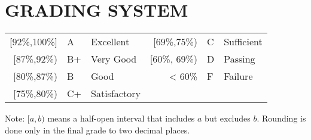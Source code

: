 \documentclass[10pt]{article}
\begin{document}
\section{GRADING SYSTEM}
\begin{center}
	\begin{tabular}{rll|rll}
	{[}92\%,100\%] & A & Excellent & 	{[}69\%,75\%) & C & Sufficient\\
	{[}87\%,92\%) & B+ & Very Good &			{[}60\%, 69\%) & D & Passing\\
	{[}80\%,87\%) & B & Good & 			< 60\% & F & Failure\\
	{[}75\%,80\%) & C+ & Satisfactory \\
	\end{tabular}
\end{center}
Note: $[a,b)$ means a half-open interval that includes $a$ but excludes $b$. Rounding is done only in the final grade to two decimal places.
\end{document}
